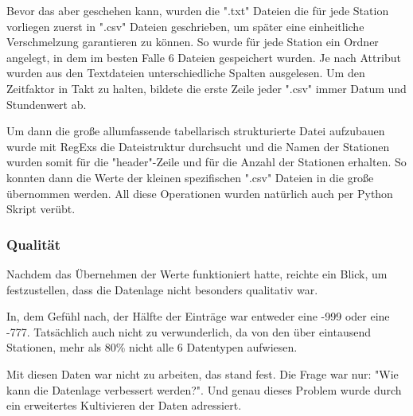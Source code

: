 \documentclass[letterpaper]{article} %
\begin{document}
        Bevor das aber geschehen kann, wurden die ".txt" Dateien die für jede Station vorliegen zuerst in ".csv" Dateien geschrieben, um später eine einheitliche Verschmelzung garantieren zu können. So wurde für jede Station ein Ordner angelegt, in dem im besten Falle 6 Dateien gespeichert wurden. Je nach Attribut wurden aus den Textdateien unterschiedliche Spalten ausgelesen. Um den Zeitfaktor in Takt zu halten, bildete die erste Zeile jeder ".csv" immer Datum und Stundenwert ab.
        
        Um dann die große allumfassende tabellarisch strukturierte Datei aufzubauen wurde mit RegExs die Dateistruktur durchsucht und die Namen der Stationen wurden somit für die "header"-Zeile und für die Anzahl der Stationen erhalten. So konnten dann die Werte der kleinen spezifischen ".csv" Dateien in die große übernommen werden. All diese Operationen wurden natürlich auch per Python Skript verübt.

        \subsubsection*{Qualität}
            Nachdem das Übernehmen der Werte funktioniert hatte, reichte ein Blick, um festzustellen, dass die Datenlage nicht besonders qualitativ war.
            
            In, dem Gefühl nach, der Hälfte der Einträge war entweder eine -999 oder eine -777. Tatsächlich auch nicht zu verwunderlich, da von den über eintausend Stationen, mehr als 80\% nicht alle 6 Datentypen aufwiesen.
            
            Mit diesen Daten war nicht zu arbeiten, das stand fest. Die Frage war nur: "Wie kann die Datenlage verbessert werden?".
            Und genau dieses Problem wurde durch ein erweitertes Kultivieren der Daten adressiert.
\end{document}

